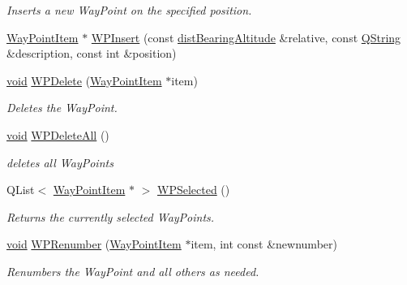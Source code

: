 \begin{DoxyCompactItemize}
\begin{DoxyCompactList}\small\item\em \-Inserts a new \-Way\-Point on the specified position. \end{DoxyCompactList}\item 
\hyperlink{classmapcontrol_1_1_way_point_item}{\-Way\-Point\-Item} $\ast$ \hyperlink{group___o_p_map_widget_gaf16670bc38e8aca978582a35732e2e6b}{\-W\-P\-Insert} (const \hyperlink{structmapcontrol_1_1dist_bearing_altitude}{dist\-Bearing\-Altitude} \&relative, const \hyperlink{group___u_a_v_objects_plugin_gab9d252f49c333c94a72f97ce3105a32d}{\-Q\-String} \&description, const int \&position)
\item 
\hyperlink{group___u_a_v_objects_plugin_ga444cf2ff3f0ecbe028adce838d373f5c}{void} \hyperlink{group___o_p_map_widget_gacb242b413e111fc504749bdfacc16fd2}{\-W\-P\-Delete} (\hyperlink{classmapcontrol_1_1_way_point_item}{\-Way\-Point\-Item} $\ast$item)
\begin{DoxyCompactList}\small\item\em \-Deletes the \-Way\-Point. \end{DoxyCompactList}\item 
\hyperlink{group___u_a_v_objects_plugin_ga444cf2ff3f0ecbe028adce838d373f5c}{void} \hyperlink{group___o_p_map_widget_ga2dd5bd06f443a496f6f81464ef44b614}{\-W\-P\-Delete\-All} ()
\begin{DoxyCompactList}\small\item\em deletes all \-Way\-Points \end{DoxyCompactList}\item 
\-Q\-List$<$ \hyperlink{classmapcontrol_1_1_way_point_item}{\-Way\-Point\-Item} $\ast$ $>$ \hyperlink{group___o_p_map_widget_ga6051fad972405dd8b2a27196b4569684}{\-W\-P\-Selected} ()
\begin{DoxyCompactList}\small\item\em \-Returns the currently selected \-Way\-Points. \end{DoxyCompactList}\item 
\hyperlink{group___u_a_v_objects_plugin_ga444cf2ff3f0ecbe028adce838d373f5c}{void} \hyperlink{group___o_p_map_widget_gaba5ee1743df3dee15e552f21a0c5d141}{\-W\-P\-Renumber} (\hyperlink{classmapcontrol_1_1_way_point_item}{\-Way\-Point\-Item} $\ast$item, int const \&newnumber)
\begin{DoxyCompactList}\small\item\em \-Renumbers the \-Way\-Point and all others as needed. \end{DoxyCompactList}\item 

\end{DoxyCompactItemize}
